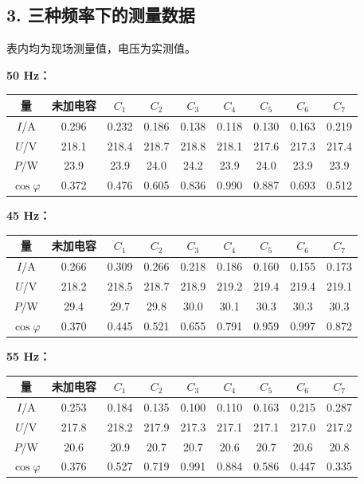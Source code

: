 \subsection*{3. 三种频率下的测量数据}

表内均为现场测量值，电压为实测值。

\textbf{50 Hz：}

\begin{center}\small
\begin{tabular}{ccccccccc}
\toprule
量 & 未加电容 & $C_1$ & $C_2$ & $C_3$ & $C_4$ & $C_5$ & $C_6$ & $C_7$ \\
\midrule
$I$/A & 0.296 & 0.232 & 0.186 & 0.138 & 0.118 & 0.130 & 0.163 & 0.219 \\
$U$/V & 218.1 & 218.4 & 218.7 & 218.8 & 218.1 & 217.6 & 217.3 & 217.4 \\
$P$/W & 23.9 & 23.9 & 24.0 & 24.2 & 23.9 & 24.0 & 23.9 & 23.9 \\
$\cos\varphi$ & 0.372 & 0.476 & 0.605 & 0.836 & 0.990 & 0.887 & 0.693 & 0.512 \\
\bottomrule\end{tabular}\end{center}

\textbf{45 Hz：}

\begin{center}\small
\begin{tabular}{ccccccccc}
\toprule
量 & 未加电容 & $C_1$ & $C_2$ & $C_3$ & $C_4$ & $C_5$ & $C_6$ & $C_7$ \\
\midrule
$I$/A & 0.266 & 0.309 & 0.266 & 0.218 & 0.186 & 0.160 & 0.155 & 0.173 \\
$U$/V & 218.2 & 218.5 & 218.7 & 218.9 & 219.2 & 219.4 & 219.4 & 219.1 \\
$P$/W & 29.4 & 29.7 & 29.8 & 30.0 & 30.1 & 30.3 & 30.3 & 30.3 \\
$\cos\varphi$ & 0.370 & 0.445 & 0.521 & 0.655 & 0.791 & 0.959 & 0.997 & 0.872 \\
\bottomrule\end{tabular}\end{center}

\textbf{55 Hz：}

\begin{center}\small
\begin{tabular}{ccccccccc}
\toprule
量 & 未加电容 & $C_1$ & $C_2$ & $C_3$ & $C_4$ & $C_5$ & $C_6$ & $C_7$ \\
\midrule
$I$/A & 0.253 & 0.184 & 0.135 & 0.100 & 0.110 & 0.163 & 0.215 & 0.287 \\
$U$/V & 217.8 & 218.2 & 217.9 & 217.3 & 217.1 & 217.1 & 217.0 & 217.2 \\
$P$/W & 20.6 & 20.9 & 20.7 & 20.7 & 20.6 & 20.7 & 20.6 & 20.8 \\
$\cos\varphi$ & 0.376 & 0.527 & 0.719 & 0.991 & 0.884 & 0.586 & 0.447 & 0.335 \\
\bottomrule\end{tabular}\end{center}




